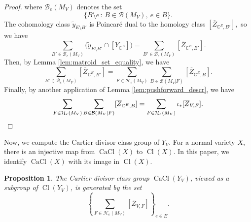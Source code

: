\documentclass{amsart}
\theoremstyle{plain}
\newtheorem{proposition}[theorem]{Proposition}
\theoremstyle{definition}
\newcommand{\Cl}{\operatorname{Cl}}
\newcommand{\CaCl}{\operatorname{CaCl}}
\begin{document}
\begin{proof}
    where $\mathcal{B}_e(M_V)$ denotes the set
    \[\{B \setminus e \, : \, B \in \mathcal{B}(M_V), \: e\in B\}.\]
    The cohomology class $\tilde{y}_{E \setminus B'}$ is Poincar\'e dual to the homology class $[\overline{Z}_{\mathbb{C}^E,B'}],$ so we have
    \[\sum_{B' \in \mathcal{B}_e(M_V)} \big( \tilde{y}_{E \setminus B'} \cap[Y_{\mathbb{C}^E}]\big) = \sum_{B' \in \mathcal{B}_e(M_V)} [\overline{Z}_{\mathbb{C}^E,B'}].\]    
    Then, by Lemma \ref{lem:matroid_set_equality}, we have
    \begin{equation*}
    \label{eq:multiplication_identity_5}
    \sum_{B' \in \mathcal{B}_e(M_V)} [\overline{Z}_{\mathbb{C}^E,B'}]=\sum_{F \in \mathcal{H}_e(M_V)}\sum_{B \in \mathcal{B}(M_V | F)} [\overline{Z}_{\mathbb{C}^E, B}].
    \end{equation*}
    Finally, by another application of Lemma \ref{lem:pushforward_descr}, we have    
    \[ \sum_{F \in \mathcal{H}_e(M_V)}\sum_{B \in \mathcal{B}(M_V | F)} [\overline{Z}_{\mathbb{C}^E, B}]=\sum_{F \in \mathcal{H}_e(M_V)} \iota_*[\overline{Z}_{V, F}]. \qedhere\]
\end{proof}

Now, we compute the Cartier divisor class group of $Y_V$. For a normal variety $X$, there is an injective map from $\CaCl(X)$ to $\Cl(X).$ In this paper, we identify $\CaCl(X)$ with its image in $\Cl(X).$

\begin{proposition}
\label{prop:cartier_class_group}
    The Cartier divisor class group $\CaCl(Y_V)$, viewed as a subgroup of $\Cl(Y_V)$, is generated by the set
    \[ \left\{ \sum_{F \in \mathcal{H}_e(M_V)} [\overline{Z}_{V,F} ] \right\}_{e\in E}.\]
\end{proposition}
\end{document}

